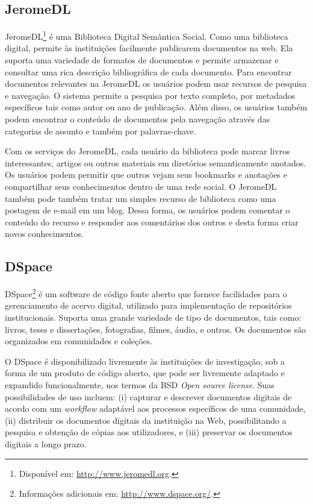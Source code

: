 \subsection{JeromeDL}

JeromeDL\footnote{Disponível em: \url{http://www.jeromedl.org}.}  é uma Biblioteca Digital Semântica Social. Como uma biblioteca digital, permite às instituições facilmente publicarem documentos na web. Ela suporta uma variedade de formatos de documentos e permite armazenar e consultar uma rica descrição bibliográfica de cada documento. Para encontrar documentos relevantes na JeromeDL os usuários podem usar recursos de pesquisa e navegação. O sistema permite a pesquisa por texto completo, por metadados específicos tais como autor ou ano de publicação. Além disso, os usuários também podem encontrar o conteúdo de documentos pela navegação através das categorias de assunto e também por palavras-chave.

Com os serviços do JeromeDL, cada usuário da biblioteca pode marcar livros interessantes, artigos ou outros materiais em diretórios semanticamente anotados. Os usuários podem permitir que outros vejam seus bookmarks e anotações e compartilhar seus conhecimentos dentro de uma rede social. O JeromeDL também pode também tratar um simples recurso de biblioteca como uma postagem de e-mail em um blog. Dessa forma, os usuários podem comentar o conteúdo do recurso e responder aos comentários dos outros e desta forma criar novos conhecimentos.

\subsection{DSpace}

DSpace\footnote{Informações adicionais em: \url{http://www.dspace.org/}.} é um software de código fonte aberto que fornece facilidades para o gerenciamento de acervo digital, utilizado para implementação de repositórios institucionais. Suporta uma grande variedade de tipo de documentos, tais como: livros, teses e dissertações, fotografias, filmes, áudio, e outros. Os documentos são organizados em comunidades e coleções.

O DSpace é disponibilizado livremente às instituições de investigação, sob a forma de um produto de código aberto, que pode ser livremente adaptado e expandido funcionalmente, nos termos da BSD \textit{Open source license}. Suas possibilidades de uso incluem: (i) capturar e descrever documentos digitais de acordo com um \textit{workflow} adaptável aos processos específicos de uma comunidade, (ii) distribuir os documentos digitais da instituição na Web, possibilitando a pesquisa e obtenção de cópias aos utilizadores, e (iii) preservar os documentos digitais a longo prazo.

